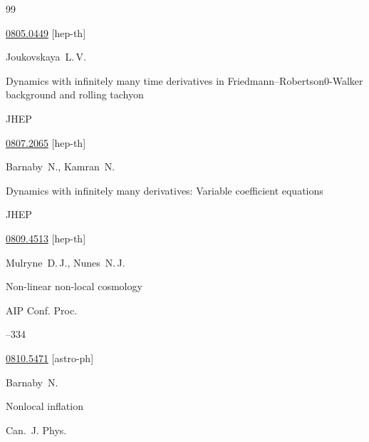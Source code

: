 \begin{thebibliography}{99}

\arxiv \href{http://arxiv.org/abs/0805.0449}{0805.0449} [hep-th]







\by Joukovskaya~L.\,V.

\paper  Dynamics with infinitely many time derivatives in Friedmann--Robertson0-Walker background and rolling tachyon

\jour JHEP 





\arxiv \href{http://arxiv.org/abs/0807.2065}{0807.2065} [hep-th]





\by Barnaby~N.,  Kamran~N.

\paper Dynamics with infinitely many derivatives: Variable coefficient equations

\jour JHEP





\arxiv \href{http://arxiv.org/abs/0809.4513}{0809.4513} [hep-th]





\by Mulryne~D.\,J.,  Nunes~N.\,J.

\paper Non-linear non-local cosmology

\jour AIP Conf. Proc. 



--334

\arxiv \href{http://arxiv.org/abs/0810.5471}{0810.5471} [astro-ph]




\by  Barnaby~N.

\paper Nonlocal inflation

\jour Can.~J. Phys.


\end{thebibliography}
